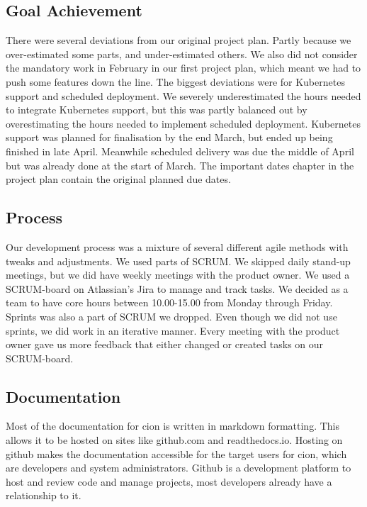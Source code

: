 

\subsection{Goal Achievement}
There were several deviations from our original project plan. Partly because we over-estimated some parts, and under-estimated others. We also did not consider the mandatory work in February in our first project plan, which meant we had to push some features down the line. The biggest deviations were for Kubernetes support and scheduled deployment. We severely underestimated the hours needed to integrate Kubernetes support, but this was partly balanced out by overestimating the hours needed to implement scheduled deployment. Kubernetes support was planned for finalisation by the end March, but ended up being finished in late April. Meanwhile scheduled delivery was due the middle of April but was already done at the start of March. The important dates chapter in the project plan contain the original planned due dates.

\subsection{Process}
Our development process was a mixture of several different agile methods with tweaks and adjustments. We used parts of SCRUM. We skipped daily stand-up meetings, but we did have weekly meetings with the product owner.  We used a SCRUM-board on Atlassian's Jira to manage and track tasks. We decided as a team to have core hours between 10.00-15.00 from Monday through Friday. Sprints was also a part of SCRUM we dropped. Even though we did not use sprints, we did work in an iterative manner. Every meeting with the product owner gave us more feedback that either changed or created tasks on our SCRUM-board.


\subsection{Documentation}
Most of the documentation for cion is written in markdown\cite{github-markdown} formatting. This allows it to be hosted on sites like github.com and readthedocs.io. Hosting on github makes the documentation accessible for the target users for cion, which are developers and system administrators. Github is a development platform to host and review code and manage projects\cite{github}, most developers already have a relationship to it.
